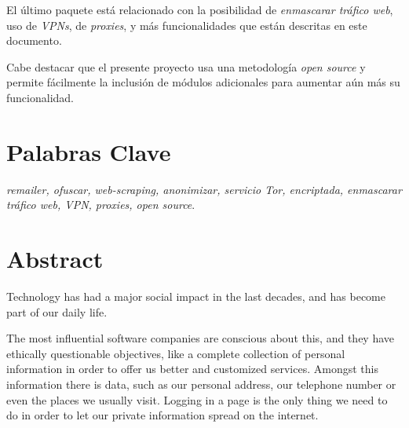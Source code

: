 El último paquete está relacionado con la posibilidad de
\textit{enmascarar tráfico web}, uso de \textit{VPNs}, de
\textit{proxies}, y más funcionalidades que están descritas en este
documento.

Cabe destacar que el presente proyecto usa una metodología
\textit{open source} y permite fácilmente la inclusión de módulos
adicionales para aumentar aún más su funcionalidad.

\section*{Palabras Clave}
\textit{remailer, ofuscar, web-scraping, anonimizar, servicio Tor, encriptada, enmascarar tráfico web, VPN, proxies, open source}.
\newpage

\section*{Abstract}
Technology has had a major social impact in the last decades, and has become part of our daily life.

The most influential software companies are conscious about this, and
they have ethically questionable objectives, like a complete
collection of personal information in order to offer us better and
customized services. Amongst this information there is  data,
such as our personal address, our telephone number or even the places
we usually visit. Logging in a page is the only
thing we need to do in order to let our private information spread on
the internet.

